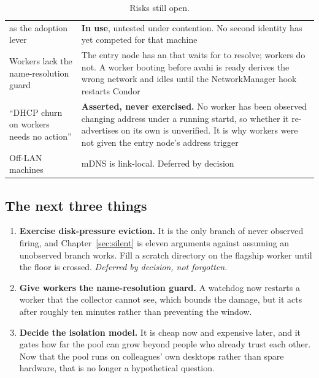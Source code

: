 \begin{table}[H]
\begin{tabularx}{\textwidth}{L{0.36\textwidth} Y}
 as the adoption lever & \textbf{In use}, untested under contention. No second identity has yet competed for that machine \\
Workers lack the name-resolution guard & The entry node has an  that waits for  to resolve; workers do not. A worker booting before avahi is ready derives the wrong network and idles until the NetworkManager hook restarts Condor \\
``DHCP churn on workers needs no action'' & \textbf{Asserted, never exercised.} No worker has been observed changing address under a running startd, so whether it re-advertises on its own is unverified. It is why workers were not given the entry node's address trigger \\
Off-LAN machines & mDNS is link-local. Deferred by decision \\
\bottomrule
\end{tabularx}
\caption{Risks still open.}
\end{table}

\subsection{The next three things}

\begin{enumerate}
  \item \textbf{Exercise disk-pressure eviction.} It is the only branch of
         never observed firing, and Chapter~\ref{sec:silent}
        is eleven arguments against assuming an unobserved branch works. Fill a
        scratch directory on the flagship worker until the floor is crossed.
        \emph{Deferred by decision, not forgotten.}
  \item \textbf{Give workers the name-resolution guard.} A watchdog now
        restarts a worker that the collector cannot see, which bounds the
        damage, but it acts after roughly ten minutes rather than preventing
        the window.
  \item \textbf{Decide the isolation model.} It is cheap now and expensive later,
        and it gates how far the pool can grow beyond people who already trust
        each other. Now that the pool runs on colleagues' own desktops rather
        than spare hardware, that is no longer a hypothetical question.
\end{enumerate}
